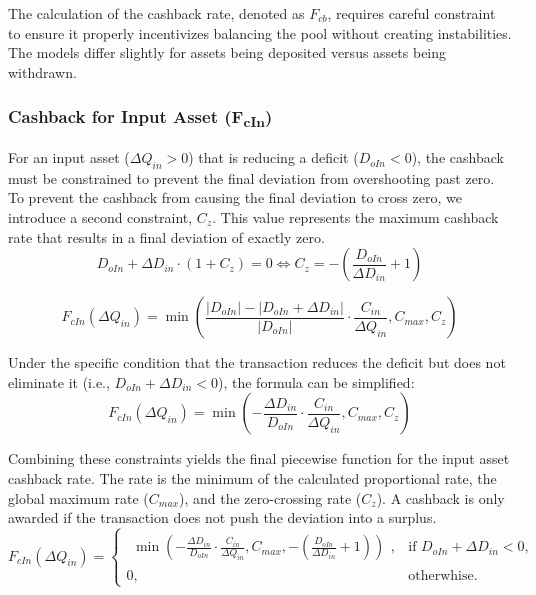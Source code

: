 The calculation of the cashback rate, denoted as $F_{cb}$, requires careful constraint to ensure it properly incentivizes balancing the pool without creating instabilities. The models differ slightly for assets being deposited versus assets being withdrawn.

\subsubsection*{Cashback for Input Asset (F\textsubscript{cIn})}

For an input asset ($\Delta Q_{in} > 0$) that is reducing a deficit ($D_{oIn} < 0$), the cashback must be constrained to prevent the final deviation from overshooting past zero.
To prevent the cashback from causing the final deviation to cross zero, we introduce a second constraint, $C_z$. This value represents the maximum cashback rate that results in a final deviation of exactly zero.
\begin{equation}
	\label{eq:cashback_constraint for_amount_in}
	D_{oIn} + \Delta D_{in} \cdot (1 + C_z) = 0 \iff C_z = -\left(\frac{D_{oIn}}{\Delta D_{in}} + 1\right)
\end{equation}

\begin{equation}
	\label{eq:invariant_swap_cashback_in_function}
	F_{cIn}(\Delta Q_{in}) = \min\left(\frac{\lvert D_{oIn} \rvert - \lvert D_{oIn} + \Delta D_{in} \rvert}{ \lvert D_{oIn} \rvert} \cdot \frac{C_{in}}{\Delta Q_{in}}, C_{max}, C_z\right)
\end{equation}

Under the specific condition that the transaction reduces the deficit but does not eliminate it (i.e., $D_{oIn} + \Delta D_{in} < 0$), the formula can be simplified:
\begin{equation}
	\label{eq:invariant_swap_cashback_in_function_simplified}
	F_{cIn}(\Delta Q_{in}) = \min\left(-\frac{ \Delta D_{in}}{ D_{oIn}} \cdot \frac{C_{in}}{\Delta Q_{in}}, C_{max}, C_z\right)
\end{equation}


Combining these constraints yields the final piecewise function for the input asset cashback rate. The rate is the minimum of the calculated proportional rate, the global maximum rate ($C_{max}$), and the zero-crossing rate ($C_z$). A cashback is only awarded if the transaction does not push the deviation into a surplus.
\begin{equation}
	\label{eq:swap_invariant_cashback_in_function_final}
	F_{cIn}(\Delta Q_{in}) = \begin{cases}
		\begin{aligned} \min\left(-\frac{ \Delta D_{in}}{ D_{oIn}} \cdot \frac{C_{in}}{\Delta Q_{in}}, C_{max}, -\left(\frac{D_{oIn}}{\Delta D_{in}} + 1\right)\right) \end{aligned}, & \text{if } D_{oIn} + \Delta D_{in} < 0, \\
		0, & \text{otherwhise.}
	\end{cases}	
\end{equation}

